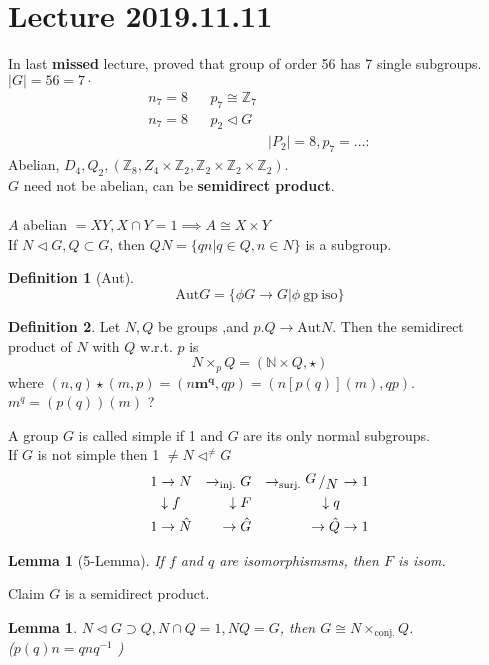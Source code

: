 \documentclass{article}
\newcommand{\N}{\mathbb{N}}
\newcommand{\Z}{\mathbb{Z}}
\newcommand{\quotient}[2]{{\raisebox{.2em}{$#1$}\left/\raisebox{-.2em}{$#2$}\right.}}
\newcommand{\gp}{\mathrm{gp}}
\newcommand{\aut}{\mathrm{Aut}}
\newtheorem{lemma}[theorem]{Lemma}
\theoremstyle{definition}
\newtheorem{definition}{Definition}[section]
\theoremstyle{remark}
\theoremstyle{example}
\begin{document}
	\section*{Lecture 2019.11.11}
	In last \textbf{missed} lecture, proved that group of order 56 has 7 single subgroups.\\
	$|G|=56=7 \cdot$
	\begin{align*}
		n_7 = 8 & & p_7 \cong \Z_7\\
		n_7 = 8 & & p_2 \triangleleft G\\
		& & & |P_2|=8,p_7=...:
	\end{align*}
	Abelian, $D_4, Q_2, (\Z_8, Z_4 \times \Z_2, \Z_2 \times \Z_2 \times \Z_2)$.\\
	$G$ need not be abelian, can be \textbf{semidirect product}.\\
	\\
	$A$ abelian $=XY, X \cap Y=1 \implies A \cong X \times Y$\\
	If $N \triangleleft G, Q \subset G$, then $QN=\{qn|q \in Q, n \in N\}$ is a subgroup.\\
	\begin{definition}[Aut]
		\[\aut G = \{ \phi G \to G | \phi\ \gp\ \mathrm{iso} \}\]
	\end{definition}
	\begin{definition}
		Let $N,Q$ be groups ,and $p.Q \rightarrow \aut N$. Then the semidirect product of $N$ with $Q$ w.r.t. $p$ is \[ N \times_p Q = (\N \times Q, \star) \] where $(n,q) \star (m,p) = (n\mathbf{m^q},qp)= (n[p(q)](m),qp)$.\\
		$m^q=(p(q))(m)$ ? 
	\end{definition}

	A group $G$ is called simple if 1 and $G$ are its only normal subgroups.\\
	If $G$ is not simple then 1 $\neq N \triangleleft^{\neq} G$\\
	\begin{align*}
		1 & \to N  & \to_\mathrm{inj.} G& &\to_\mathrm{surj.}\quotient{G}{N} & \to 1\\
		& \downarrow f & \downarrow F & &   \downarrow q \\
		1 & \to \hat{N} & \to \hat{G} & & \to \hat{Q} & \to 1
	\end{align*}
	
	\begin{lemma}[5-Lemma]
		If $f$ and $q$ are isomorphismsms, then $F$ is isom.
	\end{lemma}

	Claim $G$ is a semidirect product.\\
	\begin{lemma}
		$N \triangleleft G \supset Q, N \cap Q = 1, NQ=G$, then $G \cong N \times_\mathrm{conj.} Q$.\\
		($p(q)n=qnq^{-1}$	)
	\end{lemma}
\end{document}

